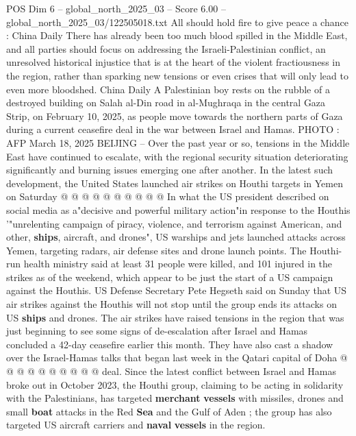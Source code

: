 \begin{textsample}{POS Dim 6 – global\_north\_2025\_03 – Score 6.00 – global\_north\_2025\_03/122505018.txt}  \label{ex:f6_pos_223}
All should hold fire to give peace a chance : China Daily There has already been too much blood spilled in the Middle East, and all parties should focus on addressing the Israeli-Palestinian conflict, an unresolved historical injustice that is at the heart of the violent fractiousness in the region, rather than sparking new tensions or even crises that will only lead to even more bloodshed.
China Daily A Palestinian boy rests on the rubble of a destroyed building on Salah al-Din road in al-Mughraqa in the central Gaza Strip, on February 10, 2025, as people move towards the northern parts of Gaza during a current ceasefire deal in the war between Israel and Hamas.
PHOTO : AFP March 18, 2025 BEIJING -- Over the past year or so, tensions in the Middle East have continued to escalate, with the regional security situation deteriorating significantly and burning issues emerging one after another.
In the latest such development, the United States launched air strikes on Houthi targets in Yemen on Saturday @ @ @ @ @ @ @ @ @ @ In what the US president described on social media as a"decisive and powerful military action"in response to the Houthis '"unrelenting campaign of piracy, violence, and terrorism against American, and other, \textbf{ships}, aircraft, and drones", US warships and jets launched attacks across Yemen, targeting radars, air defense sites and drone launch points.
The Houthi-run health ministry said at least 31 people were killed, and 101 injured in the strikes as of the weekend, which appear to be just the start of a US campaign against the Houthis.
US Defense Secretary Pete Hegseth said on Sunday that US air strikes against the Houthis will not stop until the group ends its attacks on US \textbf{ships} and drones.
The air strikes have raised tensions in the region that was just beginning to see some signs of de-escalation after Israel and Hamas concluded a 42-day ceasefire earlier this month.
They have also cast a shadow over the Israel-Hamas talks that began last week in the Qatari capital of Doha @ @ @ @ @ @ @ @ @ @ deal.
Since the latest conflict between Israel and Hamas broke out in October 2023, the Houthi group, claiming to be acting in solidarity with the Palestinians, has targeted \textbf{merchant} \textbf{vessels} with missiles, drones and small \textbf{boat} attacks in the Red \textbf{Sea} and the Gulf of Aden ; the group has also targeted US aircraft carriers and \textbf{naval} \textbf{vessels} in the region.

\end{textsample}
